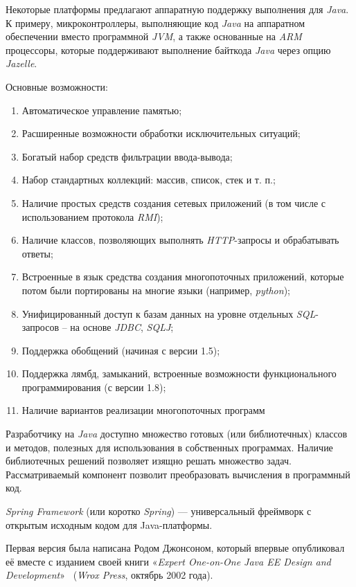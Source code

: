 Некоторые платформы предлагают аппаратную поддержку выполнения для \textit{Java}. К примеру, микроконтроллеры, выполняющие код \textit{Java} на аппаратном обеспечении вместо программной \textit{JVM}, а также основанные на \textit{ARM} процессоры, которые поддерживают выполнение байткода \textit{Java} через опцию \textit{Jazelle}.

Основные возможности:

\begin{enumerate}
	\item Автоматическое управление памятью;
	\item Расширенные возможности обработки исключительных ситуаций;
	\item Богатый набор средств фильтрации ввода-вывода;
	\item Набор стандартных коллекций: массив, список, стек и т. п.;
	\item Наличие простых средств создания сетевых приложений (в том числе с использованием протокола \textit{RMI});
	\item Наличие классов, позволяющих выполнять \textit{HTTP}-запросы и обрабатывать ответы;
	\item Встроенные в язык средства создания многопоточных приложений, которые потом были портированы на многие языки (например, \textit{python});
	\item Унифицированный доступ к базам данных на уровне отдельных \textit{SQL}-запросов – на основе \textit{JDBC}, \textit{SQLJ};
	\item Поддержка обобщений (начиная с версии 1.5);
	\item Поддержка лямбд, замыканий, встроенные возможности функционального программирования (с версии 1.8);
	\item Наличие вариантов реализации многопоточных программ
\end{enumerate}

Разработчику на \textit{Java} доступно множество готовых (или библиотечных) классов и методов, полезных для использования в собственных программах. Наличие библиотечных решений позволяет изящно решать множество задач. Рассматриваемый компонент позволит преобразовать вычисления в программный код.

\textit{Spring Framework} (или коротко \textit{Spring}) — универсальный фреймворк с открытым исходным кодом для Java-платформы. 

Первая версия была написана Родом Джонсоном, который впервые опубликовал её вместе с изданием своей книги «\textit{Expert One-on-One Java EE Design and Development}»~\cite{spring} (\textit{Wrox Press}, октябрь 2002 года).

